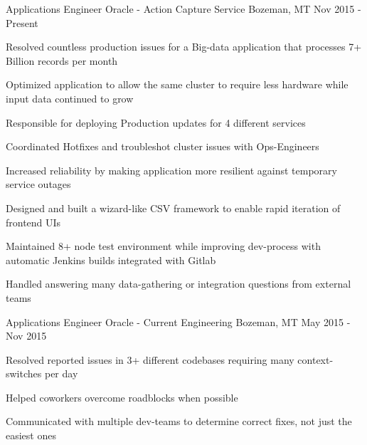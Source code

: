 

\begin{cventries}

  \cventry
    {Applications Engineer} %
    {Oracle - Action Capture Service} %
    {Bozeman, MT} %
    {Nov 2015 - Present} %
    {
      \begin{cvitems} %
        \item {Resolved countless production issues for a Big-data application that processes 7+ Billion records per month}
        \item {Optimized application to allow the same cluster to require less hardware while input data continued to grow}
        \item {Responsible for deploying Production updates for 4 different services}
        \item {Coordinated Hotfixes and troubleshot cluster issues with Ops-Engineers}
        \item {Increased reliability by making application more resilient against temporary service outages}
        \item {Designed and built a wizard-like CSV framework to enable rapid iteration of frontend UIs}
        \item {Maintained 8+ node test environment while improving dev-process with automatic Jenkins builds integrated with Gitlab}
        \item {Handled answering many data-gathering or integration questions from external teams}
      \end{cvitems}
    }

  \cventry
    {Applications Engineer} %
    {Oracle - Current Engineering} %
    {Bozeman, MT} %
    {May 2015 - Nov 2015} %
    {
      \begin{cvitems} %
        \item {Resolved reported issues in 3+ different codebases requiring many context-switches per day}
        \item {Helped coworkers overcome roadblocks when possible}
        \item {Communicated with multiple dev-teams to determine correct fixes, not just the easiest ones}
      \end{cvitems}
    }


\end{cventries}
